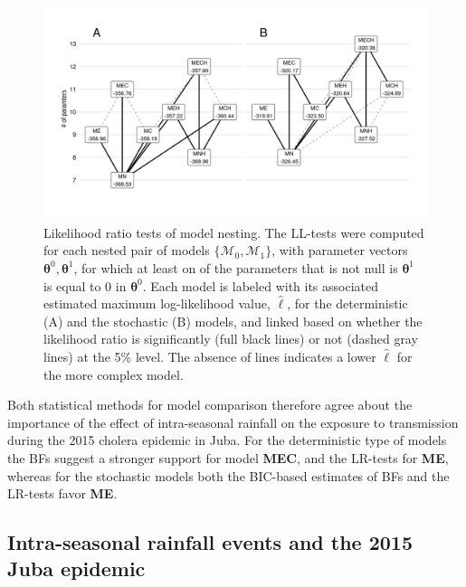 \begin{figure}
    \centering
    \includegraphics[width = \textwidth, trim = 11mm 19mm 10mm 12mm, clip]{fig_cholera-rainfall/Lemaitre_ACTROP_2018_42_R1_fig3.png}
    \caption[Likelihood ratio tests of model nesting]{Likelihood ratio tests of model nesting. The LL-tests were computed for each nested pair of models $\{\mathcal{M}_0, \mathcal{M}_1\}$, with parameter vectors $\boldsymbol{\theta}^0,\boldsymbol{\theta}^1$, for which at least on of the parameters that is not null is $\boldsymbol{\theta}^1$ is equal to 0 in $\boldsymbol{\theta}^0$. Each model is labeled with its associated estimated maximum log-likelihood value, $\hat{\ell}$, for the deterministic (A) and the stochastic (B) models, and linked based on whether the likelihood ratio is significantly (full black lines) or not (dashed gray lines) at the 5\% level. The absence of lines indicates a lower $\hat{\ell}$ for the more complex model.} 
    \label{fig:lltests}
\end{figure}

Both statistical methods for model comparison therefore agree about the importance of the effect of intra-seasonal rainfall on the exposure to transmission during the 2015 cholera epidemic in Juba. For the deterministic type of models the BFs suggest a stronger support for model \textbf{MEC}, and the LR-tests for \textbf{ME}, whereas for the stochastic models both the BIC-based estimates of BFs and the LR-tests favor \textbf{ME}. 

\subsection{Intra-seasonal rainfall events and the 2015 Juba epidemic}

